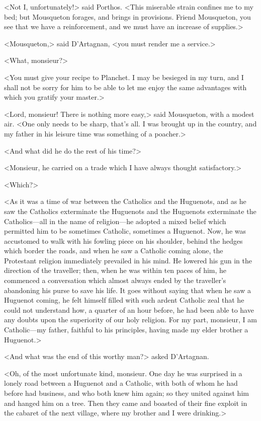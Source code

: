 <Not I, unfortunately!> said Porthos. <This miserable strain confines me to my bed; but Mousqueton forages, and brings in provisions. Friend Mousqueton, you see that we have a reinforcement, and we must have an increase of supplies.> 

<Mousqueton,> said D'Artagnan, <you must render me a service.> 

<What, monsieur?> 

<You must give your recipe to Planchet. I may be besieged in my turn, and I shall not be sorry for him to be able to let me enjoy the same advantages with which you gratify your master.> 

<Lord, monsieur! There is nothing more easy,> said Mousqueton, with a modest air. <One only needs to be sharp, that's all. I was brought up in the country, and my father in his leisure time was something of a poacher.> 

<And what did he do the rest of his time?> 

<Monsieur, he carried on a trade which I have always thought satisfactory.> 

<Which?> 

<As it was a time of war between the Catholics and the Huguenots, and as he saw the Catholics exterminate the Huguenots and the Huguenots exterminate the Catholics—all in the name of religion—he adopted a mixed belief which permitted him to be sometimes Catholic, sometimes a Huguenot. Now, he was accustomed to walk with his fowling piece on his shoulder, behind the hedges which border the roads, and when he saw a Catholic coming alone, the Protestant religion immediately prevailed in his mind. He lowered his gun in the direction of the traveller; then, when he was within ten paces of him, he commenced a conversation which almost always ended by the traveller's abandoning his purse to save his life. It goes without saying that when he saw a Huguenot coming, he felt himself filled with such ardent Catholic zeal that he could not understand how, a quarter of an hour before, he had been able to have any doubts upon the superiority of our holy religion. For my part, monsieur, I am Catholic—my father, faithful to his principles, having made my elder brother a Huguenot.> 

<And what was the end of this worthy man?> asked D'Artagnan. 

<Oh, of the most unfortunate kind, monsieur. One day he was surprised in a lonely road between a Huguenot and a Catholic, with both of whom he had before had business, and who both knew him again; so they united against him and hanged him on a tree. Then they came and boasted of their fine exploit in the cabaret of the next village, where my brother and I were drinking.> 

